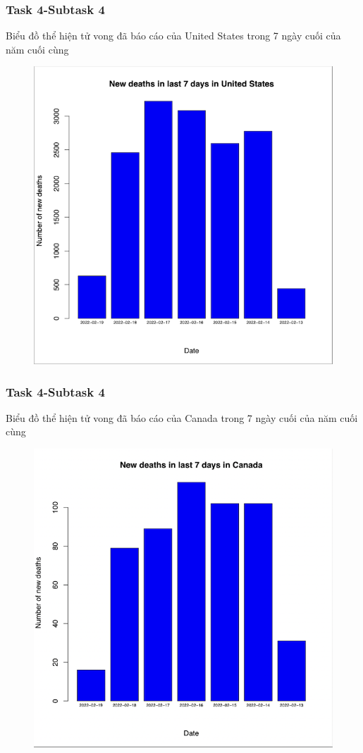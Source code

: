 \documentclass[english,10pt,table]{beamer}
\begin{document}
\frame
{
    \frametitle{Task 4-Subtask 4}
    \begin{block}{Biểu đồ thể hiện tử vong đã báo cáo của United States trong 7 ngày cuối của năm cuối cùng}
    \begin{figure}[H]
		\centering
		\includegraphics[scale=0.6]{images/4.3.1.png}
	\end{figure}
    \end{block}
}
\frame
{
    \frametitle{Task 4-Subtask 4}
    \begin{block}{Biểu đồ thể hiện tử vong đã báo cáo của Canada trong 7 ngày cuối của năm cuối cùng}
    \begin{figure}[H]
		\centering
		\includegraphics[scale=0.6]{images/4.3.2.png}
	\end{figure}
    \end{block}
}
\end{document}
